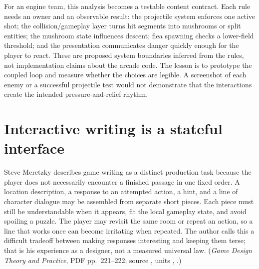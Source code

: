 For an engine team, this analysis becomes a testable content contract. Each rule needs an owner and an observable result: the projectile system enforces one active shot; the collision/gameplay layer turns hit segments into mushrooms or split entities; the mushroom state influences descent; flea spawning checks a lower-field threshold; and the presentation communicates danger quickly enough for the player to react. These are proposed system boundaries inferred from the rules, not implementation claims about the arcade code. The lesson is to prototype the coupled loop and measure whether the choices are legible. A screenshot of each enemy or a successful projectile test would not demonstrate that the interactions create the intended pressure-and-relief rhythm.

\section{Interactive writing is a stateful interface}\label{06-engine-ii-ch046-interactive-writing-is-a-stateful-interface}

\hypertarget{06-engine-ii-ch046-interactive-writing-is-a-stateful-interface}{}

Steve Meretzky describes game writing as a distinct production task because the player does not necessarily encounter a finished passage in one fixed order. A location description, a response to an attempted action, a hint, and a line of character dialogue may be assembled from separate short pieces. Each piece must still be understandable when it appears, fit the local gameplay state, and avoid spoiling a puzzle. The player may revisit the same room or repeat an action, so a line that works once can become irritating when repeated. The author calls this a difficult tradeoff between making responses interesting and keeping them terse; that is his experience as a designer, not a measured universal law. (\emph{Game Design Theory and Practice}, PDF pp.~221--222; source , units , .)

